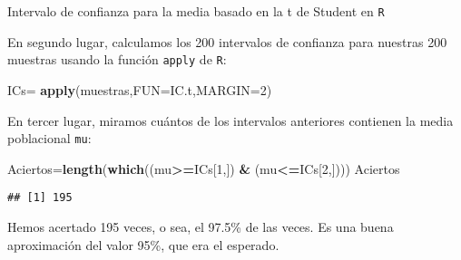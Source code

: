 \documentclass[ignorenonframetext,]{beamer}
\newenvironment{Shaded}{\begin{snugshade}}{\end{snugshade}}
\newcommand{\DataTypeTok}[1]{\textcolor[rgb]{0.13,0.29,0.53}{#1}}
\newcommand{\DecValTok}[1]{\textcolor[rgb]{0.00,0.00,0.81}{#1}}
\newcommand{\KeywordTok}[1]{\textcolor[rgb]{0.13,0.29,0.53}{\textbf{#1}}}
\newcommand{\NormalTok}[1]{#1}
\newcommand{\OperatorTok}[1]{\textcolor[rgb]{0.81,0.36,0.00}{\textbf{#1}}}
\newcommand{\StringTok}[1]{\textcolor[rgb]{0.31,0.60,0.02}{#1}}
\begin{document}
\begin{frame}[fragile]{Intervalo de confianza para la media basado en la
t de Student en \texttt{R}}
\protect\hypertarget{intervalo-de-confianza-para-la-media-basado-en-la-t-de-student-en-r-5}{}

En segundo lugar, calculamos los 200 intervalos de confianza para
nuestras 200 muestras usando la función \texttt{apply} de \texttt{R}:

\begin{Shaded}
\begin{Highlighting}[]
\NormalTok{ICs=}\StringTok{ }\KeywordTok{apply}\NormalTok{(muestras,}\DataTypeTok{FUN=}\NormalTok{IC.t,}\DataTypeTok{MARGIN=}\DecValTok{2}\NormalTok{)}
\end{Highlighting}
\end{Shaded}

En tercer lugar, miramos cuántos de los intervalos anteriores contienen
la media poblacional \texttt{mu}:

\begin{Shaded}
\begin{Highlighting}[]
\NormalTok{Aciertos=}\KeywordTok{length}\NormalTok{(}\KeywordTok{which}\NormalTok{((mu}\OperatorTok{>=}\NormalTok{ICs[}\DecValTok{1}\NormalTok{,]) }\OperatorTok{&}\StringTok{ }\NormalTok{(mu}\OperatorTok{<=}\NormalTok{ICs[}\DecValTok{2}\NormalTok{,])))}
\NormalTok{Aciertos}
\end{Highlighting}
\end{Shaded}

\begin{verbatim}
## [1] 195
\end{verbatim}

Hemos acertado 195 veces, o sea, el 97.5\% de las veces. Es una buena
aproximación del valor 95\%, que era el esperado.

\end{frame}
\end{document}
